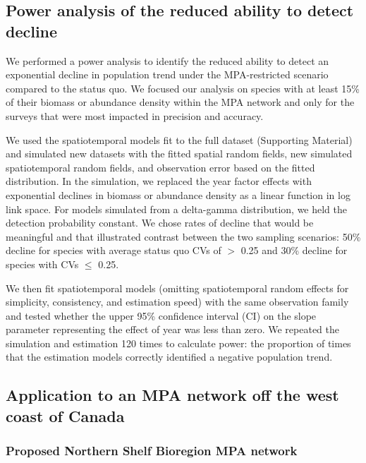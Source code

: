 \documentclass[12pt]{article}
\begin{document}
\subsection*{Power analysis of the reduced ability to detect decline}

We performed a power analysis to identify the reduced ability to detect an exponential decline in population trend under the MPA-restricted scenario compared to the status quo.
We focused our analysis on species with at least 15\% of their biomass or abundance density within the MPA network and only for the surveys that were most impacted in precision and accuracy.

We used the spatiotemporal models fit to the full dataset (Supporting Material) and simulated new datasets with the fitted spatial random fields, new simulated spatiotemporal random fields, and observation error based on the fitted distribution.
In the simulation, we replaced the year factor effects with exponential declines in biomass or abundance density as a linear function in log link space.
For models simulated from a delta-gamma distribution, we held the detection probability constant.
We chose rates of decline that would be meaningful and that illustrated contrast between the two sampling scenarios: 50\% decline for species with average status quo CVs of $>$ 0.25 and 30\% decline for species with CVs $\le$ 0.25.

We then fit spatiotemporal models (omitting spatiotemporal random effects for simplicity, consistency, and estimation speed) with the same observation family and tested whether the upper 95\% confidence interval (CI) on the slope parameter representing the effect of year was less than zero.
We repeated the simulation and estimation 120 times to calculate power: the proportion of times that the estimation models correctly identified a negative population trend.

\subsection*{Application to an MPA network off the west coast of Canada}

\subsubsection*{Proposed Northern Shelf Bioregion MPA network}
\end{document}
